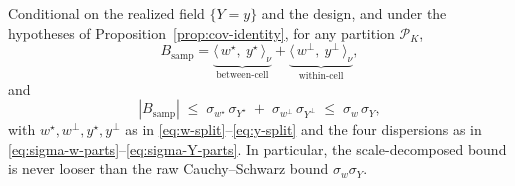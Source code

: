 \begin{proposition}
\label{prop:scale-decomp}
Conditional on the realized field $\{Y=y\}$ and the design, and under
the hypotheses of Proposition~\ref{prop:cov-identity}, for any
partition $\mathcal{P}_K$,
\[
  B_{\mathrm{samp}}
  =\underbrace{\big\langle\,w^{\star},\ y^{\star}\,\big\rangle_\nu}_{\text{between-cell}}
  +\underbrace{\big\langle\,w^{\perp},\ y^{\perp}\,\big\rangle_\nu}_{\text{within-cell}},
\]
and
\[
  |B_{\mathrm{samp}}|
  \;\le\; \sigma_{w^{\star}}\,\sigma_{Y^{\star}}
        \;+\;\sigma_{w^{\perp}}\,\sigma_{Y^{\perp}}
  \;\le\; \sigma_w\,\sigma_Y ,
\]
with $w^{\star},w^{\perp},y^{\star},y^{\perp}$ as in
\eqref{eq:w-split}--\eqref{eq:y-split} and the four dispersions as in
\eqref{eq:sigma-w-parts}--\eqref{eq:sigma-Y-parts}. In particular, the
scale-decomposed bound is never looser than the raw Cauchy--Schwarz
bound $\sigma_w\sigma_Y$.
\end{proposition}
